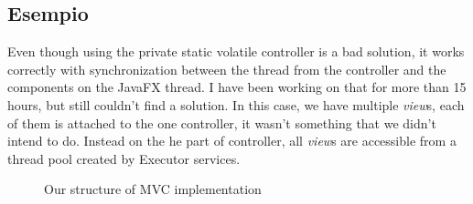 \documentclass[a4paper,12pt]{report}
\begin{document}
\subsection*{Esempio}

Even though using the private static volatile controller is a bad solution, it works correctly with synchronization between the thread from the controller and the components on the JavaFX thread. 
I have been working on that for more than 15 hours, but still couldn't find a solution. In this case, we have multiple \textit{view}s, each of them is attached to the one controller, it wasn't something that we didn't intend to do.
Instead on the he part of controller, all \textit{view}s are accessible from a thread pool created by Executor services. 

\begin{figure}[H]
	\centering{}
	\caption{Our structure of MVC implementation}
	\label{img:MVC}
	\end{figure}
\end{document}
